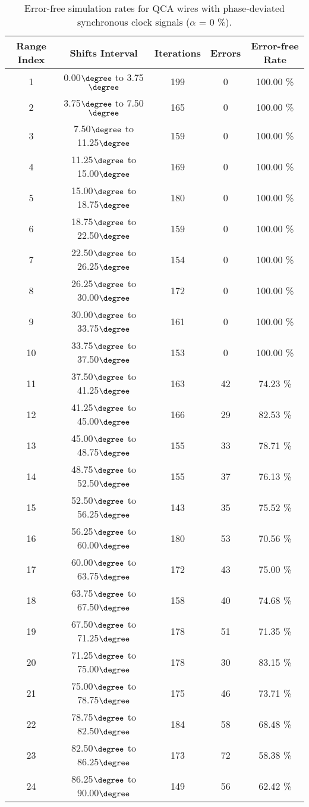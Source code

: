\flushleft
\begin{table}[h]
\begin{center}
\caption{Error-free simulation rates for QCA wires with phase-deviated synchronous clock signals ($\alpha$ = 0 \%).}
\begin{tabular}{|c|c|c|c|c|}
\hline
\textbf{Range Index} & \textbf{Shifts Interval} & \textbf{Iterations} & \textbf{Errors} & \textbf{Error-free Rate} \\
\hline
1  &  0.00$\degree$ to  3.75$\degree$ & 199 &  0 & 100.00 \% \\
\hline
2  &  3.75$\degree$ to  7.50$\degree$ & 165 &  0 & 100.00 \% \\
\hline
3  &  7.50$\degree$ to 11.25$\degree$ & 159 &  0 & 100.00 \% \\
\hline
4  & 11.25$\degree$ to 15.00$\degree$ & 169 &  0 & 100.00 \% \\
\hline
5  & 15.00$\degree$ to 18.75$\degree$ & 180 &  0 & 100.00 \% \\
\hline
6  & 18.75$\degree$ to 22.50$\degree$ & 159 &  0 & 100.00 \% \\
\hline
7  & 22.50$\degree$ to 26.25$\degree$ & 154 &  0 & 100.00 \% \\
\hline
8  & 26.25$\degree$ to 30.00$\degree$ & 172 &  0 & 100.00 \% \\
\hline
9  & 30.00$\degree$ to 33.75$\degree$ & 161 &  0 & 100.00 \% \\
\hline
10 & 33.75$\degree$ to 37.50$\degree$ & 153 &  0 & 100.00 \% \\
\hline
11 & 37.50$\degree$ to 41.25$\degree$ & 163 & 42 &  74.23 \% \\
\hline
12 & 41.25$\degree$ to 45.00$\degree$ & 166 & 29 &  82.53 \% \\
\hline
13 & 45.00$\degree$ to 48.75$\degree$ & 155 & 33 &  78.71 \% \\
\hline
14 & 48.75$\degree$ to 52.50$\degree$ & 155 & 37 &  76.13 \% \\
\hline
15 & 52.50$\degree$ to 56.25$\degree$ & 143 & 35 &  75.52 \% \\
\hline
16 & 56.25$\degree$ to 60.00$\degree$ & 180 & 53 &  70.56 \% \\
\hline
17 & 60.00$\degree$ to 63.75$\degree$ & 172 & 43 &  75.00 \% \\
\hline
18 & 63.75$\degree$ to 67.50$\degree$ & 158 & 40 &  74.68 \% \\
\hline
19 & 67.50$\degree$ to 71.25$\degree$ & 178 & 51 &  71.35 \% \\
\hline
20 & 71.25$\degree$ to 75.00$\degree$ & 178 & 30 &  83.15 \% \\
\hline
21 & 75.00$\degree$ to 78.75$\degree$ & 175 & 46 &  73.71 \% \\
\hline
22 & 78.75$\degree$ to 82.50$\degree$ & 184 & 58 &  68.48 \% \\
\hline
23 & 82.50$\degree$ to 86.25$\degree$ & 173 & 72 &  58.38 \% \\
\hline
24 & 86.25$\degree$ to 90.00$\degree$ & 149 & 56 &  62.42 \% \\
\hline


\end{tabular}
\end{center}
\end{table}
